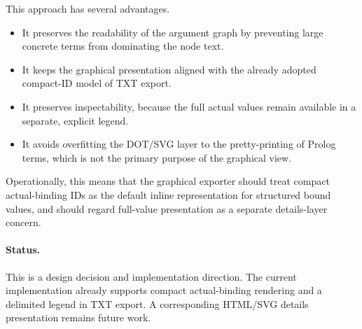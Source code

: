 This approach has several advantages.

\begin{itemize}
\item It preserves the readability of the argument graph by preventing large concrete terms
from dominating the node text.
\item It keeps the graphical presentation aligned with the already adopted compact-ID model
of TXT export.
\item It preserves inspectability, because the full actual values remain available in a separate,
explicit legend.
\item It avoids overfitting the DOT/SVG layer to the pretty-printing of Prolog terms, which is
not the primary purpose of the graphical view.
\end{itemize}

Operationally, this means that the graphical exporter should treat compact actual-binding
IDs as the default inline representation for structured bound values, and should regard
full-value presentation as a separate details-layer concern.

\paragraph{Status.}
This is a design decision and implementation direction. The current implementation
already supports compact actual-binding rendering and a delimited legend in TXT export.
A corresponding HTML/SVG details presentation remains future work.
